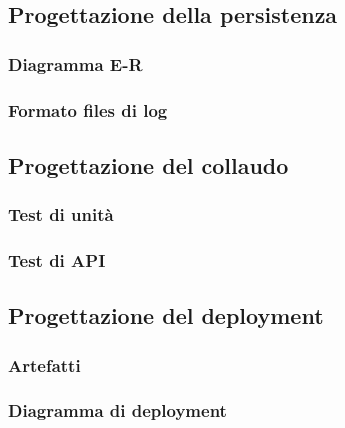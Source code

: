 \documentclass{article}
\begin{document}
\subsection{Progettazione della persistenza}
\subsubsection{Diagramma E-R}

\subsubsection{Formato files di log}


\subsection{Progettazione del collaudo}
\subsubsection{Test di unità}

\subsubsection{Test di API}


\subsection{Progettazione del deployment}
\subsubsection{Artefatti}

\subsubsection{Diagramma di deployment}

\end{document}
